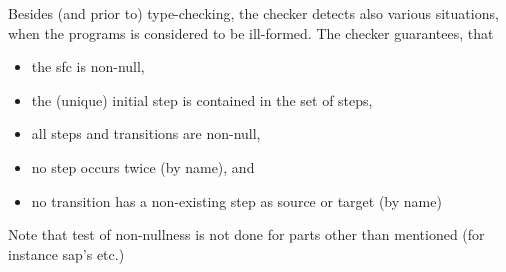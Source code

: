 Besides (and prior to) type-checking, the checker detects also various
situations, when the programs is considered to be ill-formed. The checker
guarantees, that
\begin{itemize}
\item the sfc is non-null, 
\item the (unique) initial step is contained in the set of steps,
\item all steps and transitions are non-null, 
\item no step occurs twice (by name), and
\item no transition has a non-existing step as source or target (by name)
\end{itemize}
Note that test of non-nullness is not done for parts other than mentioned
(for instance sap's etc.)  





